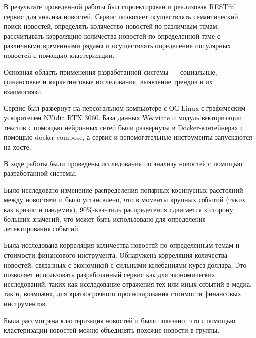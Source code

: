 
В результате проведенной работы был спроектирован и реализован RESTful сервис для анализа новостей. Сервис позволяет осуществлять семантический поиск новостей, определять количество новостей по различным темам, рассчитывать корреляцию количества новостей по определенной теме с различными временными рядами и осуществлять определение популярных новостей с помощью кластеризации.

Основная область применения разработанной системы ~-- социальные, финансовые и маркетинговые исследования, выявление трендов и их взаимосвязи.

Сервис был развернут на персональном компьютере с ОС Linux с графическим ускорителем NVidia RTX 3060. База данных Weaviate и модуль векторизации текстов с помощью нейронных сетей были развернуты в Docker-контейнерах с помощью docker compose, а сервис и вспомогательные инструменты запускаются на хосте.

В ходе работы были проведены исследования по анализу новостей с помощью разработанной системы.

Было исследовано изменение распределения попарных косинусных расстояний между новостями и было установлено, что в моменты крупных событий (таких как кризис и пандемия), 90\%-квантиль распределения сдвигается в сторону больших значений, что может быть использовано для определения детектирования событий.

Была исследована корреляция количества новостей по определенным темам и стоимости финансового инструмента. Обнаружена корреляция количества новостей, связанных с экономикой с сильными колебаниями курса доллара. Это позволяет использовать разработанный сервис как для экономических исследований, таких как исследование отражения тех или иных событий в медиа, так и, возможно, для краткосрочного прогнозирования стоимости финансовых инструментов.

Была рассмотрена кластеризация новостей и было показано, что с помощью кластеризации новостей можно объединять похожие новости в группы.

